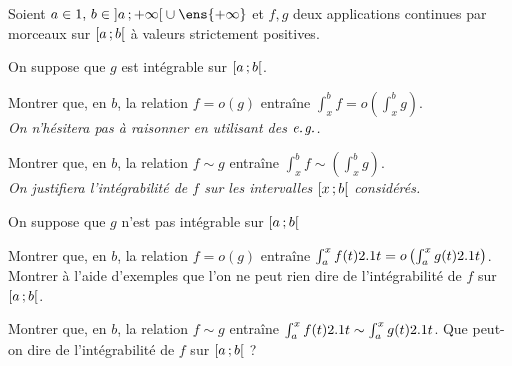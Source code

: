\begin{exercice}
Soient $a\in \R,\, b \in \interoo{a}{+\infty} \cup \ens{+\infty}$ et $f, g$ deux applications continues par morceaux sur $\left[a\,;b\right[$ à valeurs strictement positives.
\begin{questions}
    \item On suppose que $g$ est intégrable sur $\left[a\,;b\right[$.
    \begin{questions}
        \item Montrer que, en $b$, la relation $f = o(g)$ entraîne $\int_x^{b} f = o\left(\int_x^b g\right)$. \\
        \emph{
        On n'hésitera pas à raisonner en utilisant des $\textit{e.\nobreak\hspace{1pt}{}g.}$.
        }
        \item Montrer que, en $b$, la relation $f \sim g$ entraîne $\int_x^{b}f \sim \left(\int_x^b g\right)$. \\
        \emph{
        On justifiera l'intégrabilité de $f$ sur les intervalles $\left[x\,;b\right[$ considérés.
        }
    \end{questions}
    \item On suppose que $g$ n'est pas intégrable sur $\left[a\,;b\right[$
    \begin{questions}
        \item Montrer que, en $b$, la relation $f = o(g)$ entraîne $\int_a^{x} f(t) 2.1 t = o\left(\int_a^x g(t) 2.1 t\right)$.
        Montrer à l'aide d'exemples que l'on ne peut rien dire de l'intégrabilité de $f$ sur $\left[a\,;b\right[$.
        \item Montrer que, en $b$, la relation $f \sim g$ entraîne $\int_a^{x} f(t) 2.1 t \sim \int_a^x g(t) 2.1 t$.
        Que peut-on dire de l'intégrabilité de $f$ sur $\left[a\,;b\right[$ ?
    \end{questions}
\end{questions}
\end{exercice}

